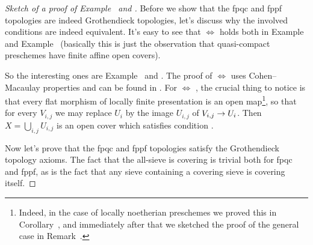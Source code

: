 \documentclass[a4paper,parskip=half,numbers=enddot, DIV=12]{scrreprt}
\begin{document}
\begin{proof}[Sketch of a proof of Example~ and ]
	Before we show that the fpqc and fppf topologies are indeed Grothendieck topologies, let's discuss why the involved conditions are indeed equivalent. It's easy to see that  $\Leftrightarrow$  holds both in Example~ and Example~ (basically this is just the observation that quasi-compact preschemes have finite affine open covers).
	
	So the interesting ones are Example~ and . The proof of  $\Leftrightarrow$  uses Cohen--Macaulay properties and can be found in \cite[]{stacks-project}. For  $\Leftrightarrow$ , the crucial thing to notice is that every flat morphism of locally finite presentation is an open map\footnote{Indeed, in the case of locally noetherian preschemes we proved this in Corollary~, and immediately after that we sketched the proof of the general case in Remark~.}, so that for every $V_{i,j}$ we may replace $U_i$ by the image $U_{i,j}$ of $V_{i,j}\morphism U_i$. Then $X=\bigcup_{i,j}U_{i,j}$ is an open cover which satisfies condition .
	
	Now let's prove that the fpqc and fppf topologies satisfy the Grothendieck topology axioms. The fact that the all-sieve is covering is trivial both for fpqc and fppf, as is the fact that any sieve containing a covering sieve is covering itself.
	

\end{proof}
\end{document}
